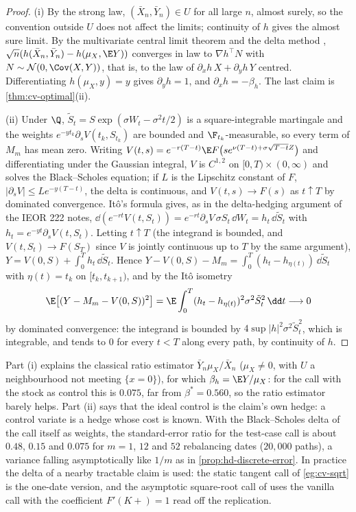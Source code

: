 \begin{proof}
(i) By the strong law, $(\bar X_n,\bar Y_n)\in U$ for all large $n$, almost surely, so the
convention outside $U$ does not affect the limits; continuity of $h$ gives the almost sure
limit. By the multivariate
central limit theorem and the delta method \citep[Theorem~3.1]{vandervaart-asymptotic},
$\sqrt n(h(\bar X_n,\bar Y_n)-h(\mu_X,\E Y))$ converges in law to
$\nabla h^\top N$ with $N\sim\mathcal N(0,\Cov(X,Y))$, that is, to the law of
$\partial_xh\,X+\partial_yh\,Y$ centred. Differentiating $h(\mu_X,y)=y$ gives $\partial_yh=1$,
and $\partial_xh=-\beta_h$. The last claim is \cref{thm:cv-optimal}(ii).

(ii) Under $\Q$, $\tilde S_t=S\exp(\sigma W_t-\sigma^2t/2)$ is a square-integrable martingale and
the weights $e^{-yt_k}\partial_sV(t_k,S_{t_k})$ are bounded and $\F_{t_k}$-measurable, so every
term of $M_m$ has mean zero. Writing
$V(t,s)=e^{-r(T-t)}\E F\big(se^{\nu(T-t)+\sigma\sqrt{T-t}Z}\big)$ and differentiating under the
Gaussian integral, $V$ is $C^{1,2}$ on $[0,T)\times(0,\infty)$ and solves the Black--Scholes
equation; if $L$ is the Lipschitz constant of $F$, $|\partial_sV|\le Le^{-y(T-t)}$, the delta is
continuous, and $V(t,s)\to F(s)$ as $t\uparrow T$ by dominated convergence. It\^o's formula gives,
as in the delta-hedging argument of the IEOR 222 notes,
$\dd(e^{-rt}V(t,S_t))=e^{-rt}\partial_sV\,\sigma S_t\,\dd W_t=h_t\,\dd\tilde S_t$ with
$h_t=e^{-yt}\partial_sV(t,S_t)$. Letting $t\uparrow T$ (the integrand is bounded, and
$V(t,S_t)\to F(S_T)$ since $V$ is jointly continuous up to $T$ by the same argument), $Y=V(0,S)+\int_0^Th_t\,\dd\tilde S_t$. Hence
$Y-V(0,S)-M_m=\int_0^T(h_t-h_{\eta(t)})\,\dd\tilde S_t$ with $\eta(t)=t_k$ on $[t_k,t_{k+1})$,
and by the It\^o isometry
\[
  \E\big[(Y-M_m-V(0,S))^2\big]=\E\int_0^T(h_t-h_{\eta(t)})^2\sigma^2\tilde S_t^2\,\dd t\longrightarrow0
\]
by dominated convergence: the integrand is bounded by $4\sup|h|^2\sigma^2\tilde S_t^2$, which
is integrable, and tends to $0$ for every $t<T$ along every path, by continuity of $h$.
\end{proof}

Part (i) explains the classical ratio estimator $\bar Y_n\mu_X/\bar X_n$ ($\mu_X\ne0$, with
$U$ a neighbourhood not meeting $\{x=0\}$), for which
$\beta_h=\E Y/\mu_X$: for the call with the stock as control this is $0.075$, far from
$\beta^*=0.560$, so the ratio estimator barely helps. Part (ii) says that the ideal control is
the claim's own hedge: a control variate is a hedge whose cost is known. With the
Black--Scholes delta of the call itself as weights, the standard-error ratio for the test-case
call is about $0.48$, $0.15$ and $0.075$ for $m=1$, $12$ and $52$ rebalancing dates
($20{,}000$ paths), a variance falling asymptotically like $1/m$ as in \cref{prop:hd-discrete-error}. In
practice the delta of a nearby tractable claim is used: the static tangent call of
\cref{eg:cv-sqrt} is the one-date version, and the asymptotic square-root call of
 uses the vanilla call with the coefficient $F'(K+)=1$ read off the
replication.

